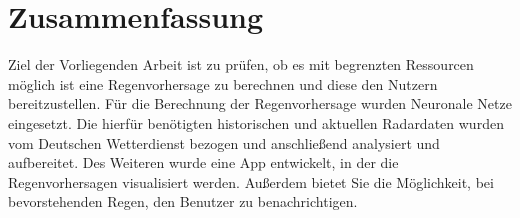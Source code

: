 \section*{Zusammenfassung}
Ziel der Vorliegenden Arbeit ist zu prüfen, ob es mit begrenzten Ressourcen möglich ist eine Regenvorhersage zu berechnen und diese den Nutzern bereitzustellen.
Für die Berechnung der Regenvorhersage wurden Neuronale Netze eingesetzt.
Die hierfür benötigten historischen und aktuellen Radardaten wurden vom Deutschen Wetterdienst bezogen und anschließend analysiert und aufbereitet. 
Des Weiteren wurde eine App entwickelt, in der die Regenvorhersagen visualisiert werden. 
Außerdem bietet Sie die Möglichkeit, bei bevorstehenden Regen, den Benutzer zu benachrichtigen. 